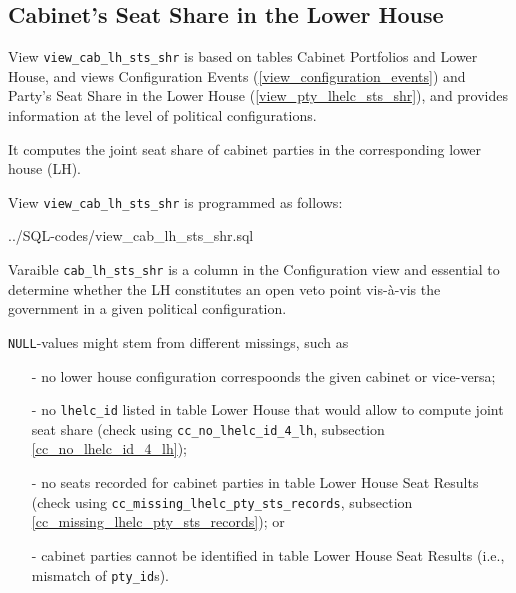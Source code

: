 \subsection{Cabinet's Seat Share in the Lower House}\label{view_cab_lh_sts_shr}
View \texttt{\footnotesize view\_cab\_lh\_sts\_shr} is based on tables Cabinet Portfolios and Lower House, and views Configuration Events (\ref{view_configuration_events}) and Party's Seat Share in the Lower House (\ref{view_pty_lhelc_sts_shr}), and provides information at the level of political configurations. 

It computes the joint seat share of cabinet parties in the corresponding lower house (LH).

View \texttt{\footnotesize view\_cab\_lh\_sts\_shr} is programmed as follows:


%
{../SQL-codes/view_cab_lh_sts_shr.sql}

Varaible \texttt{\footnotesize cab\_lh\_sts\_shr} is a column in the Configuration view and essential to determine whether the LH constitutes an open veto point vis-à-vis the government in a given political configuration.

\texttt{\footnotesize NULL}-values might stem from different missings, such as 
\begin{itemize}
\item[-]no lower house configuration correspoonds the given cabinet or vice-versa;
\item[-]no \texttt{\footnotesize lhelc\_id} listed in table Lower House that would allow to compute joint seat share (check using \texttt{\footnotesize cc\_no\_lhelc\_id\_4\_lh}, subsection \ref{cc_no_lhelc_id_4_lh});
\item[-]no seats recorded for cabinet parties in table Lower House Seat Results (check using \texttt{\footnotesize cc\_missing\_lhelc\_pty\_sts\_records}, subsection \ref{cc_missing_lhelc_pty_sts_records}); or
\item[-]cabinet parties cannot be identified in table Lower House Seat Results (i.e., mismatch of \texttt{\footnotesize pty\_id}s).
\end{itemize}



